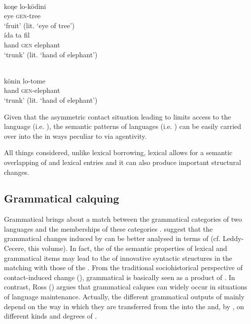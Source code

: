 \documentclass[output=paper]{langsci/langscibook}
\begin{document}
\\
\gll   koŋe lo-ködini\\
       eye \textsc{gen}-tree\\
\glt   `fruit’ (lit. ‘eye of tree’)
\z
\ex\label{eleph}
 \\
\gll   ída ta fil\\
       hand \textsc{gen} elephant \\
\glt   `trunk’ (lit. ‘hand of elephant’)

\\
\gll   könin lo-tome\\
       hand \textsc{gen}-elephant \\
\glt   `trunk’ (lit. ‘hand of elephant’)
\z
\z

Given that the asymmetric contact situation leading to   limits access to the  language (i.e.  ), the semantic patterns of  languages (i.e. ) can be easily carried over into the  in ways peculiar to  via  agentivity. 

All things considered, unlike lexical borrowing, lexical  allows for a semantic overlapping of  and  lexical entries and it can also produce important structural changes. 


 
 \subsection{Grammatical calquing}\label{sec:gra}

Grammatical  brings about a match between the grammatical categories of two languages and the memberships of these categories \citep[132]{Ross2007}. \citet{HeineKuteva2005} suggest that the grammatical changes induced by  can be better analysed in terms of  (cf. Leddy-Cecere, this volume). In fact, the  of the semantic properties of lexical and grammatical items may lead to the  of innovative syntactic structures in the  matching with those of the . From the traditional sociohistorical perspective of contact-induced change (\citealt{ThomasonKaufman1988}), grammatical  is basically seen as a product of . In contrast, Ross (\citeyear[131]{Ross2007}) argues that grammatical calques can widely occur in situations of language maintenance. Actually, the different grammatical outputs of  mainly depend on the way in which they are transferred from the  into the  and, by , on different kinds and degrees of .   
\end{document}
